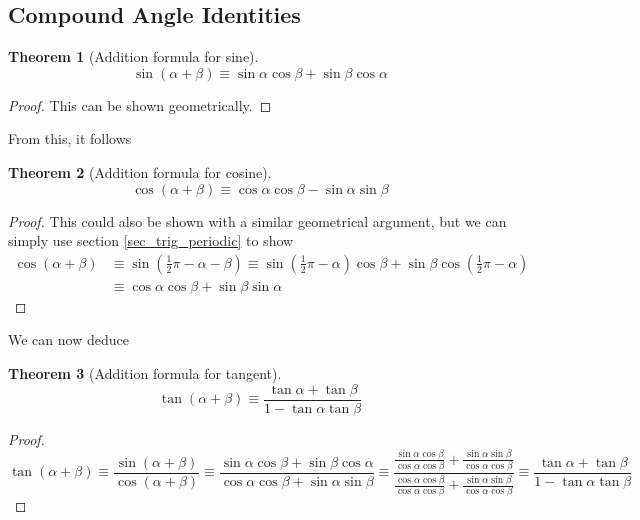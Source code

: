 \documentclass[fleqn,a4paper,11pt]{article}
\newtheorem{theorem}{Theorem}[section]
\begin{document}
    \subsection{Compound Angle Identities} \label{sec_comp_angle}


    \begin{theorem}[Addition formula for sine]
    \begin{equation*}
    \sin(\alpha + \beta) \equiv
       \sin \alpha \cos \beta +  \sin \beta \cos \alpha
    \end{equation*}
    \end{theorem}
    \begin{proof}
    This can be shown geometrically.
    \end{proof}
    From this, it follows
    \begin{theorem}[Addition formula for cosine]
    \begin{equation*}
    \cos(\alpha + \beta) \equiv
       \cos \alpha \cos \beta - \sin \alpha \sin \beta
    \end{equation*}
    \end{theorem}
    \begin{proof}
    This could also be shown with a similar geometrical argument, but we can
    simply use section \ref{sec_trig_periodic} to show
    \begin{align*}
    \cos(\alpha + \beta) &\equiv
        \sin(\frac 12 \pi - \alpha - \beta) \equiv
        \sin(\frac 12 \pi - \alpha)\cos \beta +
            \sin \beta \cos(\frac 12 \pi - \alpha) \\
    &\equiv
        \cos \alpha \cos \beta + \sin \beta \sin \alpha
    \end{align*}
    \end{proof}
    We can now deduce
    \begin{theorem}[Addition formula for tangent]
    \begin{equation*}
    \tan(\alpha + \beta) \equiv
        \frac{\tan \alpha + \tan \beta}{1 - \tan \alpha \tan \beta}
    \end{equation*}
    \end{theorem}
    \begin{proof}
    \begin{equation*}
    \tan(\alpha + \beta) \equiv
        \frac{\sin(\alpha + \beta)}{\cos(\alpha + \beta)} \equiv
        \frac{\sin \alpha \cos \beta + \sin \beta \cos \alpha}
             {\cos \alpha \cos \beta + \sin \alpha \sin \beta} \equiv
        \frac{\frac{\sin \alpha \cos \beta}{\cos \alpha \cos \beta} +
              \frac{\sin \alpha \sin \beta}{\cos \alpha \cos \beta}}
             {\frac{\cos \alpha \cos \beta}{\cos \alpha \cos \beta} +
              \frac{\sin \alpha \sin \beta}{\cos \alpha \cos \beta}}
             \equiv
        \frac{\tan \alpha + \tan \beta}{1 - \tan \alpha \tan \beta}
    \end{equation*}
    \end{proof}
\end{document}
